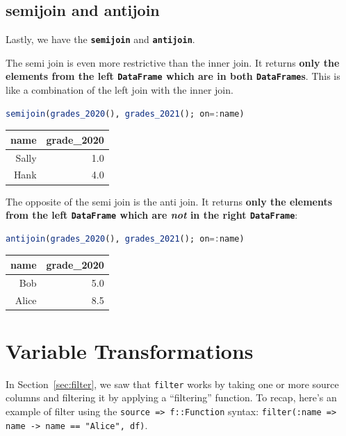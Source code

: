 \documentclass[
  notoc %
]{tufte-book}
\newcommand{\passthrough}[1]{#1}
\begin{document}
\hypertarget{sec:semijoin_antijoin}{%
\subsection{semijoin and antijoin}\label{sec:semijoin_antijoin}}

Lastly, we have the \textbf{\passthrough{\lstinline!semijoin!}} and
\textbf{\passthrough{\lstinline!antijoin!}}.

The semi join is even more restrictive than the inner join. It returns
\textbf{only the elements from the left
\passthrough{\lstinline!DataFrame!} which are in both
\passthrough{\lstinline!DataFrame!}s}. This is like a combination of the
left join with the inner join.

\begin{lstlisting}[language=Julia]
semijoin(grades_2020(), grades_2021(); on=:name)
\end{lstlisting}

\begin{longtable}[]{@{}rr@{}}
\toprule
name & grade\_2020 \\
\midrule
\endhead
Sally & 1.0 \\
Hank & 4.0 \\
\bottomrule
\end{longtable}

The opposite of the semi join is the anti join. It returns \textbf{only
the elements from the left \passthrough{\lstinline!DataFrame!} which are
\emph{not} in the right \passthrough{\lstinline!DataFrame!}}:

\begin{lstlisting}[language=Julia]
antijoin(grades_2020(), grades_2021(); on=:name)
\end{lstlisting}

\begin{longtable}[]{@{}rr@{}}
\toprule
name & grade\_2020 \\
\midrule
\endhead
Bob & 5.0 \\
Alice & 8.5 \\
\bottomrule
\end{longtable}

\hypertarget{sec:transform}{%
\section{Variable Transformations}\label{sec:transform}}

In Section~\ref{sec:filter}, we saw that
\passthrough{\lstinline!filter!} works by taking one or more source
columns and filtering it by applying a ``filtering'' function. To recap,
here's an example of filter using the
\passthrough{\lstinline!source => f::Function!} syntax:
\passthrough{\lstinline!filter(:name => name -> name == "Alice", df)!}.
\end{document}
